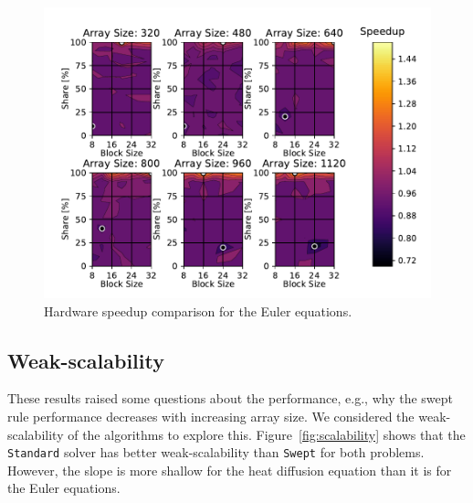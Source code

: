 \documentclass[preprints,article,accept,moreauthors,pdftex]{Definitions/mdpi}
\def\Swept{\texttt{Swept}}
\def\Standard{\texttt{Standard}}
\newcommand\fs{0.7}
\begin{document}
\begin{figure}[H]
    
    \begin{center}
        \includegraphics[scale=\fs, trim={0.75cm 0.4cm 0.8cm 0.7cm},clip]{figs/hardwareSpeedUpeuler.pdf}
        \caption{Hardware speedup comparison for the Euler equations.}
        \label{fig:eulerHardwareComp}
    \end{center}
\end{figure}




\subsection{Weak-scalability}
These results raised some questions about the performance, e.g., why the swept rule performance decreases with increasing array size. We considered the weak-scalability of the algorithms to explore this. Figure~\ref{fig:scalability} shows that the \Standard{} solver has better weak-scalability than \Swept{} for both problems. However, the slope is more shallow for the heat diffusion equation than it is for the Euler equations. 
\end{document}
